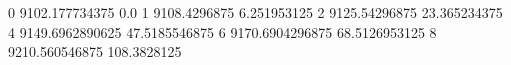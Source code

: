 0 9102.177734375 0.0
1 9108.4296875 6.251953125
2 9125.54296875 23.365234375
4 9149.6962890625 47.5185546875
6 9170.6904296875 68.5126953125
8 9210.560546875 108.3828125
